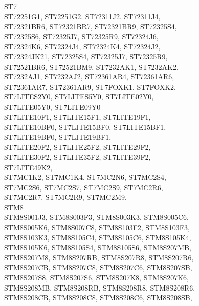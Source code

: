 \documentclass[12pt,a4paper,twoside]{report}
\begin{document}
\begin{cpulist}
   ST7 \\
\> ST72251G1, ST72251G2, ST72311J2, ST72311J4, \\
\> ST72321BR6, ST72321BR7, ST72321BR9, ST72325S4, \\
\> ST72325S6, ST72325J7, ST72325R9, ST72324J6, \\
\> ST72324K6, ST72324J4, ST72324K4, ST72324J2, \\
\> ST72324JK21, ST72325S4, ST72325J7, ST72325R9, \\
\> ST72521BR6, ST72521BM9, ST7232AK1, ST7232AK2, \\
\> ST7232AJ1, ST7232AJ2, ST72361AR4, ST72361AR6, \\
\> ST72361AR7, ST72361AR9, ST7FOXK1, ST7FOXK2, \\
\> ST7LITES2Y0, ST7LITES5Y0, ST7LITE02Y0, \\
\> ST7LITE05Y0, ST7LITE09Y0 \\
\> ST7LITE10F1, ST7LITE15F1, ST7LITE19F1, \\
\> ST7LITE10BF0, ST7LITE15BF0, ST7LITE15BF1, \\
\> ST7LITE19BF0, ST7LITE19BF1, \\
\> ST7LITE20F2, ST7LITE25F2, ST7LITE29F2, \\
\> ST7LITE30F2, ST7LITE35F2, ST7LITE39F2, \\
\> ST7LITE49K2, \\
\> ST7MC1K2, ST7MC1K4, ST7MC2N6, ST7MC2S4, \\
\> ST7MC2S6, ST7MC2S7, ST7MC2S9, ST7MC2R6, \\
\> ST7MC2R7, ST7MC2R9, ST7MC2M9, \\
\> STM8 \\
\> STM8S001J3, STM8S003F3, STM8S003K3, STM8S005C6,\\
\> STM8S005K6, STM8S007C8, STM8S103F2, STM8S103F3,\\
\> STM8S103K3, STM8S105C4, STM8S105C6, STM8S105K4,\\
\> STM8S105K6, STM8S105S4, STM8S105S6, STM8S207MB,\\
\> STM8S207M8, STM8S207RB, STM8S207R8, STM8S207R6,\\
\> STM8S207CB, STM8S207C8, STM8S207C6, STM8S207SB,\\
\> STM8S207S8, STM8S207S6, STM8S207K8, STM8S207K6,\\
\> STM8S208MB, STM8S208RB, STM8S208R8, STM8S208R6,\\
\> STM8S208CB, STM8S208C8, STM8S208C6, STM8S208SB,\\

\end{cpulist}
\end{document}
